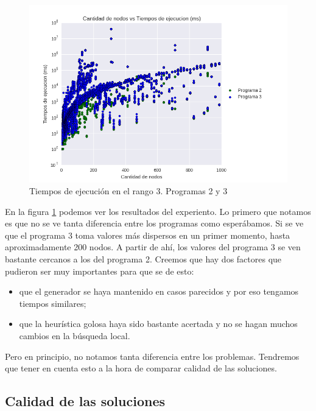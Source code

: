 \begin{figure}[H]
  \begin{center}
    \includegraphics[width=\textwidth]{img/ejercicio5/tiempos_r3.png}
    \caption{Tiempos de ejecución en el rango 3. Programas 2 y 3}
    \label{fig: ej5_tiempos_r3}
  \end{center}
\end{figure}

\par En la figura \ref{fig: ej5_tiempos_r3} podemos ver los resultados del experiento. Lo primero que notamos es que no se ve tanta diferencia entre los programas como esperábamos. Si se ve que el programa 3 toma valores más dispersos en un primer momento, hasta aproximadamente 200 nodos. A partir de ahí, los valores del programa 3 se ven bastante cercanos a los del programa 2. Creemos que hay dos factores que pudieron ser muy importantes para que se de esto:

\begin{itemize}
	\item que el generador se haya mantenido en casos parecidos y por eso tengamos tiempos similares;
	\item que la heurística golosa haya sido bastante acertada y no se hagan muchos cambios en la búsqueda local.
\end{itemize}

\par Pero en principio, no notamos tanta diferencia entre los problemas. Tendremos que tener en cuenta esto a la hora de comparar calidad de las soluciones.


\subsection{Calidad de las soluciones}


